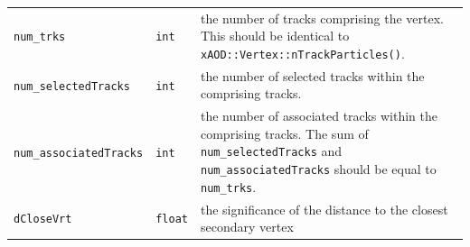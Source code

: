 \documentclass[NOTE, atlasdraft=true, texlive=2018, UKenglish]{\ATLASLATEXPATH atlasdoc}
\begin{document}
\begin{table}[htbp]
\begin{tabular}{llp{10cm}}
{\tt num\_trks} & {\tt int} & the number of tracks comprising the vertex. This should be identical to {\tt xAOD::Vertex::nTrackParticles()}.\\
{\tt num\_selectedTracks} & {\tt int} & the number of selected tracks within the comprising tracks.\\
{\tt num\_associatedTracks} & {\tt int} & the number of associated tracks within the comprising tracks. The sum of {\tt num\_selectedTracks} and {\tt num\_associatedTracks} should be equal to {\tt num\_trks}.\\
{\tt dCloseVrt} & {\tt float} & the significance of the distance to the closest secondary vertex\\
\hline
\hline
\end{tabular}
\label{tbl:auxdyn_vertices}
\end{table}%
\end{document}

